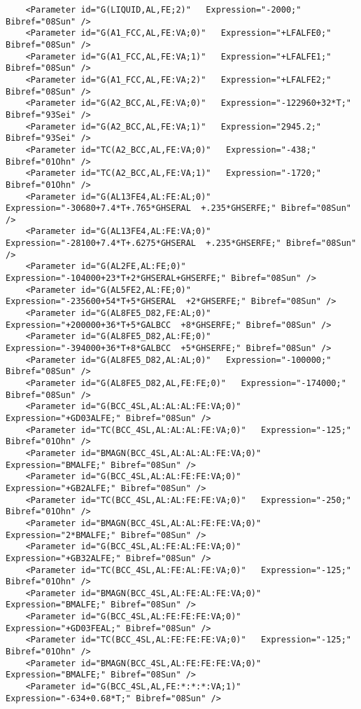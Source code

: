\documentclass[12pt]{article}
\begin{document}
\begin{appendices}
{\begin{verbatim}
    <Parameter id="G(LIQUID,AL,FE;2)"   Expression="-2000;" Bibref="08Sun" />
    <Parameter id="G(A1_FCC,AL,FE:VA;0)"   Expression="+LFALFE0;" Bibref="08Sun" />
    <Parameter id="G(A1_FCC,AL,FE:VA;1)"   Expression="+LFALFE1;" Bibref="08Sun" />
    <Parameter id="G(A1_FCC,AL,FE:VA;2)"   Expression="+LFALFE2;" Bibref="08Sun" />
    <Parameter id="G(A2_BCC,AL,FE:VA;0)"   Expression="-122960+32*T;" Bibref="93Sei" />
    <Parameter id="G(A2_BCC,AL,FE:VA;1)"   Expression="2945.2;" Bibref="93Sei" />
    <Parameter id="TC(A2_BCC,AL,FE:VA;0)"   Expression="-438;" Bibref="01Ohn" />
    <Parameter id="TC(A2_BCC,AL,FE:VA;1)"   Expression="-1720;" Bibref="01Ohn" />
    <Parameter id="G(AL13FE4,AL:FE:AL;0)"   Expression="-30680+7.4*T+.765*GHSERAL  +.235*GHSERFE;" Bibref="08Sun" />
    <Parameter id="G(AL13FE4,AL:FE:VA;0)"   Expression="-28100+7.4*T+.6275*GHSERAL  +.235*GHSERFE;" Bibref="08Sun" />
    <Parameter id="G(AL2FE,AL:FE;0)"   Expression="-104000+23*T+2*GHSERAL+GHSERFE;" Bibref="08Sun" />
    <Parameter id="G(AL5FE2,AL:FE;0)"   Expression="-235600+54*T+5*GHSERAL  +2*GHSERFE;" Bibref="08Sun" />
    <Parameter id="G(AL8FE5_D82,FE:AL;0)"   Expression="+200000+36*T+5*GALBCC  +8*GHSERFE;" Bibref="08Sun" />
    <Parameter id="G(AL8FE5_D82,AL:FE;0)"   Expression="-394000+36*T+8*GALBCC  +5*GHSERFE;" Bibref="08Sun" />
    <Parameter id="G(AL8FE5_D82,AL:AL;0)"   Expression="-100000;" Bibref="08Sun" />
    <Parameter id="G(AL8FE5_D82,AL,FE:FE;0)"   Expression="-174000;" Bibref="08Sun" />
    <Parameter id="G(BCC_4SL,AL:AL:AL:FE:VA;0)"   Expression="+GD03ALFE;" Bibref="08Sun" />
    <Parameter id="TC(BCC_4SL,AL:AL:AL:FE:VA;0)"   Expression="-125;" Bibref="01Ohn" />
    <Parameter id="BMAGN(BCC_4SL,AL:AL:AL:FE:VA;0)"   Expression="BMALFE;" Bibref="08Sun" />
    <Parameter id="G(BCC_4SL,AL:AL:FE:FE:VA;0)"   Expression="+GB2ALFE;" Bibref="08Sun" />
    <Parameter id="TC(BCC_4SL,AL:AL:FE:FE:VA;0)"   Expression="-250;" Bibref="01Ohn" />
    <Parameter id="BMAGN(BCC_4SL,AL:AL:FE:FE:VA;0)"   Expression="2*BMALFE;" Bibref="08Sun" />
    <Parameter id="G(BCC_4SL,AL:FE:AL:FE:VA;0)"   Expression="+GB32ALFE;" Bibref="08Sun" />
    <Parameter id="TC(BCC_4SL,AL:FE:AL:FE:VA;0)"   Expression="-125;" Bibref="01Ohn" />
    <Parameter id="BMAGN(BCC_4SL,AL:FE:AL:FE:VA;0)"   Expression="BMALFE;" Bibref="08Sun" />
    <Parameter id="G(BCC_4SL,AL:FE:FE:FE:VA;0)"   Expression="+GD03FEAL;" Bibref="08Sun" />
    <Parameter id="TC(BCC_4SL,AL:FE:FE:FE:VA;0)"   Expression="-125;" Bibref="01Ohn" />
    <Parameter id="BMAGN(BCC_4SL,AL:FE:FE:FE:VA;0)"   Expression="BMALFE;" Bibref="08Sun" />
    <Parameter id="G(BCC_4SL,AL,FE:*:*:*:VA;1)"   Expression="-634+0.68*T;" Bibref="08Sun" />

\end{verbatim}}
\end{appendices}
\end{document}
